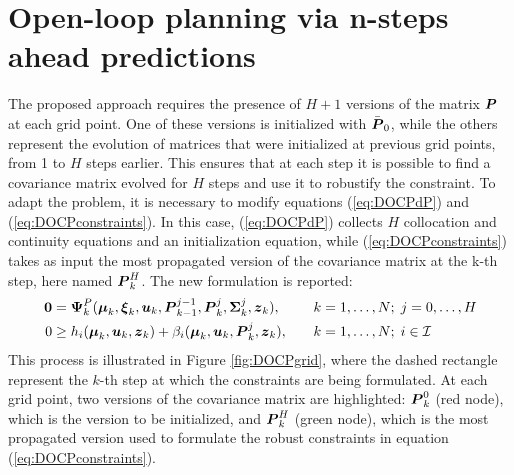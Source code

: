 \section{Open-loop planning via n-steps ahead predictions}
\label{sec:open_loop_planning}

The proposed approach requires the presence of $H+1$ versions of the matrix $\boldsymbol{P}$ at each grid point. One of these versions is initialized with $\bar{\boldsymbol{P}}_0$, while the others represent the evolution of matrices that were initialized at previous grid points, from 1 to $H$ steps earlier. This ensures that at each step it is possible to find a covariance matrix evolved for $H$ steps and use it to robustify the constraint. 
To adapt the problem, it is necessary to modify equations (\ref{eq:DOCPdP}) and (\ref{eq:DOCPconstraints}). In this case,  (\ref{eq:DOCPdP}) collects $H$ collocation and continuity equations and an initialization equation, while (\ref{eq:DOCPconstraints}) takes as input the most propagated version of the covariance matrix at the k-th step, here named $\boldsymbol{P}^H_k$. The new formulation is reported:
\begin{alignat}{3}
\bzero       = & \; \bPsiP_k(\bmu_k,\bxi_k, \bu_k, \bP_{k-1}^{j-1},\bP_k^j,\bSi_k^j,\bz_k),
& \quad & k = 1,\ldots, N; \; j=0,\ldots,H \label{eq:DOCPdPopenloop} \\
0            \geq & \; h_i(\bmu_k, \bu_k, \bz_k) + \be_i(\bmu_k, \bu_k, \bP_k^j, \bz_k),
& \quad & k = 1,\ldots, N;\; i \in \calI \label{eq:DOCPconstraintsopenloop}
\end{alignat}
This process is illustrated in Figure \ref{fig:DOCPgrid}, where the dashed rectangle represent the $k$-th step at which the constraints are being formulated. At each grid point, two versions of the covariance matrix are highlighted: $\boldsymbol{P}^0_k$ (red node), which is the version to be initialized, and $\boldsymbol{P}^H_k$ (green node), which is the most propagated version used to formulate the robust constraints in equation (\ref{eq:DOCPconstraints}).


